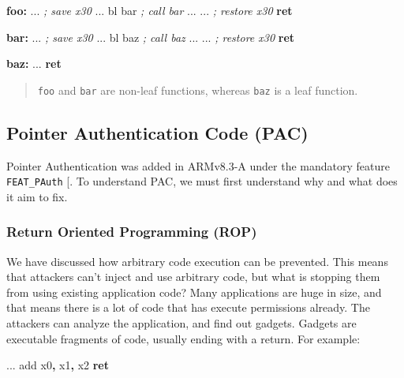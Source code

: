 \documentclass[a4paper, nobind]{templates/ociamthesis}
\newenvironment{Shaded}{\begin{snugshade}}{\end{snugshade}}
\newcommand{\BuiltInTok}[1]{#1}
\newcommand{\CommentTok}[1]{\textcolor[rgb]{0.56,0.35,0.01}{\textit{#1}}}
\newcommand{\ControlFlowTok}[1]{\textcolor[rgb]{0.13,0.29,0.53}{\textbf{#1}}}
\newcommand{\FunctionTok}[1]{\textcolor[rgb]{0.13,0.29,0.53}{\textbf{#1}}}
\newcommand{\NormalTok}[1]{#1}
\newcommand{\OperatorTok}[1]{\textcolor[rgb]{0.81,0.36,0.00}{\textbf{#1}}}
\renewenvironment{Shaded}
{
  \vspace{10pt}%
  \begin{snugshade}%
}{%
  \end{snugshade}%
  \vspace{8pt}%
}
\begin{document}
\begin{Shaded}
\begin{Highlighting}[]
\FunctionTok{foo:}
\NormalTok{  ...     }\CommentTok{; save x30}
\NormalTok{  ...}
\NormalTok{  bl bar  }\CommentTok{; call bar}
\NormalTok{  ...}
\NormalTok{  ...     }\CommentTok{; restore x30}
  \ControlFlowTok{ret}

\FunctionTok{bar:}
\NormalTok{  ...     }\CommentTok{; save x30}
\NormalTok{  ...}
\NormalTok{  bl baz  }\CommentTok{; call baz}
\NormalTok{  ...}
\NormalTok{  ...     }\CommentTok{; restore x30}
  \ControlFlowTok{ret}

\FunctionTok{baz:}
\NormalTok{  ...}
  \ControlFlowTok{ret}
\end{Highlighting}
\end{Shaded}

\begin{quote}
\texttt{foo} and \texttt{bar} are non-leaf functions, whereas \texttt{baz} is a leaf function.
\end{quote}

\subsection{Pointer Authentication Code (PAC)}\label{pac-bg}

Pointer Authentication was added in ARMv8.3-A under the mandatory feature \texttt{FEAT\_PAuth} {[}\citeproc{ref-arm-feat-names}{13}{]}.
To understand PAC, we must first understand why and what does it aim to fix.

\subsubsection{Return Oriented Programming (ROP)}\label{return-oriented-programming-rop}

We have discussed how arbitrary code execution can be prevented.
This means that attackers can't inject and use arbitrary code, but what is stopping
them from using existing application code? Many applications are huge in size,
and that means there is a lot of code that has execute permissions already.
The attackers can analyze the application, and find out gadgets. Gadgets are executable
fragments of code, usually ending with a return. For example:

\begin{Shaded}
\begin{Highlighting}[]
\NormalTok{...}
\BuiltInTok{add}\NormalTok{ x0}\OperatorTok{,}\NormalTok{ x1}\OperatorTok{,}\NormalTok{ x2}
\ControlFlowTok{ret}
\end{Highlighting}
\end{Shaded}
\end{document}
